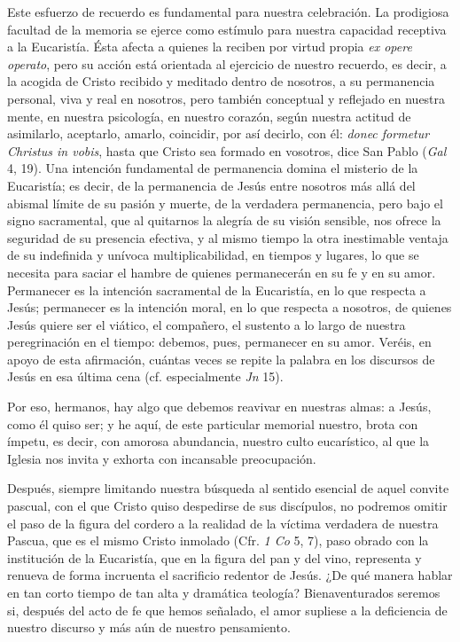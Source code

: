 \begin{body}
Este esfuerzo de recuerdo es fundamental para nuestra celebración. La prodigiosa facultad de la memoria se ejerce como estímulo para nuestra capacidad receptiva a la Eucaristía. Ésta afecta a quienes la reciben por virtud propia \textit{ex opere operato}, pero su acción está orientada al ejercicio de nuestro recuerdo, es decir, a la acogida de Cristo recibido y meditado dentro de nosotros, a su permanencia personal, viva y real en nosotros, pero también conceptual y reflejado en nuestra mente, en nuestra psicología, en nuestro corazón, según nuestra actitud de asimilarlo, aceptarlo, amarlo, coincidir, por así decirlo, con él: \textit{donec formetur Christus in vobis}, hasta que Cristo sea formado en vosotros, dice San Pablo (\textit{Gal} 4, 19). Una intención fundamental de permanencia domina el misterio de la Eucaristía; es decir, de la permanencia de Jesús entre nosotros más allá del abismal límite de su pasión y muerte, de la verdadera permanencia, pero bajo el signo sacramental, que al quitarnos la alegría de su visión sensible, nos ofrece la seguridad de su presencia efectiva, y al mismo tiempo la otra inestimable ventaja de su indefinida y unívoca multiplicabilidad, en tiempos y lugares, lo que se necesita para saciar el hambre de quienes permanecerán en su fe y en su amor. Permanecer es la intención sacramental de la Eucaristía, en lo que respecta a Jesús; permanecer es la intención moral, en lo que respecta a nosotros, de quienes Jesús quiere ser el viático, el compañero, el sustento a lo largo de nuestra peregrinación en el tiempo: debemos, pues, permanecer en su amor. Veréis, en apoyo de esta afirmación, cuántas veces se repite la palabra  en los discursos de Jesús en esa última cena (cf. especialmente \textit{Jn} 15).

Por eso, hermanos, hay algo que debemos reavivar en nuestras almas:  a Jesús, como él quiso ser; y he aquí, de este particular memorial nuestro, brota con ímpetu, es decir, con amorosa abundancia, nuestro culto eucarístico, al que la Iglesia nos invita y exhorta con incansable preocupación. 

Después, siempre limitando nuestra búsqueda al sentido esencial de aquel convite pascual, con el que Cristo quiso despedirse de sus discípulos, no podremos omitir el paso de la figura del cordero a la realidad de la víctima verdadera de nuestra Pascua, que es el mismo Cristo inmolado (Cfr. \textit{1 Co} 5, 7), paso obrado con la institución de la Eucaristía, que en la figura del pan y del vino, representa y renueva de forma incruenta el sacrificio redentor de Jesús. ¿De qué manera hablar en tan corto tiempo de tan alta y dramática teología? Bienaventurados seremos si, después del acto de fe que hemos señalado, el amor supliese a la deficiencia de nuestro discurso y más aún de nuestro pensamiento. 


\end{body}
